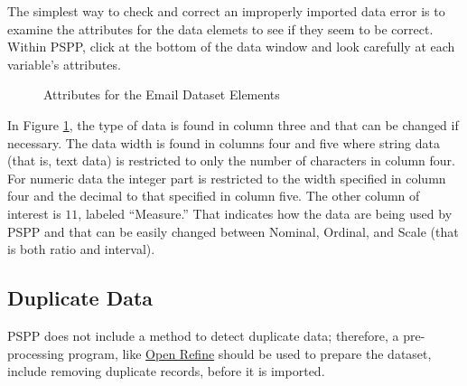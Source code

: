 The simplest way to check and correct an improperly imported data error is to examine the attributes for the data elemets to see if they seem to be correct. Within \acs{PSPP}, click \textsc{} at the bottom of the data window and look carefully at each variable's attributes.

\begin{figure}[H]
  \begin{center}
    \caption{Attributes for the Email Dataset Elements}
    \label{lab05_fig01}
  \end{center}
\end{figure}

In Figure \ref{lab05_fig01}, the type of data is found in column three and that can be changed if necessary. The data width is found in columns four and five where string data (that is, text data) is restricted to only the number of characters in column four. For numeric data the integer part is restricted to the width specified in column four and the decimal to that specified in column five. The other column of interest is $ 11 $, labeled ``Measure.'' That indicates how the data are being used by \acs{PSPP} and that can be easily changed between Nominal, Ordinal, and Scale (that is both ratio and interval).

\subsection{Duplicate Data}

\acs{PSPP} does not include a method to detect duplicate data; therefore, a pre-processing program, like \href{http://openrefine.org/}{Open Refine} should be used to prepare the dataset, include removing duplicate records, before it is imported.


